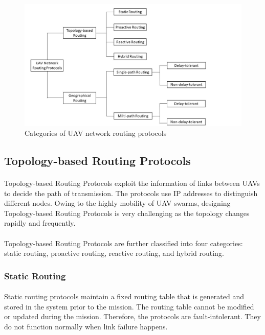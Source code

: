 \documentclass[a4paper,12pt]{report}
\begin{document}
\begin{figure}[h]
\begin{center}
\includegraphics[width=1.05\linewidth]{images/routing.jpg}
\caption{Categories of UAV network routing protocols}
\end{center}
\end{figure}

\subsection{Topology-based Routing Protocols}
\paragraph{}
Topology-based Routing Protocols exploit the information of links between UAVs to decide the path of transmission. The protocols use IP addresses to distinguish different nodes. Owing to the highly mobility of UAV swarms, designing Topology-based Routing Protocols is very challenging as the topology changes rapidly and frequently.

\paragraph{}
Topology-based Routing Protocols are further classified into four categories: static routing, proactive routing, reactive routing, and hybrid routing\cite{8772093}.

\subsubsection{Static Routing}
\paragraph{}
Static routing protocols maintain a fixed routing table that is generated and stored in the system prior to the mission. The routing table cannot be modified or updated during the mission. Therefore, the protocols are fault-intolerant\cite{Yanmaz2018DroneNC}. They do not function normally when link failure happens.
\end{document}
